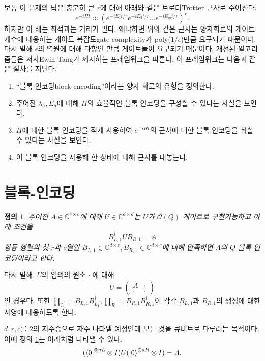\documentclass[a4paper,atbegshi,chapter]{oblivoir}
\newtheorem{defn}{정의}[chapter]
\begin{document}
보통 이 문제의 답은 충분히 큰 $r$에 대해 아래와 같은 트로터{\tiny Trotter}
근사로 주어진다.
\[
  e^{-iHt}\approx (e^{-iE_1t/r}e^{-iE_2t/r}\ldots e^{-iE_mt/r})^r.
\]
하지만 이 해는 최적과는 거리가 멀다. 왜냐하면 위와 같은 근사는 양자회로의
게이트 개수에 대응하는 게이트 복잡도{\tiny gate complexity}가 
poly($1/\epsilon$)만큼 요구되기 때문이다. 다시 말해 $\epsilon$의 역원에 대해
다항인 만큼 게이트들이 요구되기 때문이다. 개선된 알고리즘들은 저자{\tiny Ewin
Tang}가 제시하는 프레임워크을 따른다.  이 프레임워크는 다음과 같은 절차를 지닌다.
\begin{enumerate}[label=(\roman*)]
  \item ``블록-인코딩{\tiny block-encoding}''이라는 양자 회로의 유형을 정의한다.
  \item 주어진 $\lambda_a, E_a$에 대해 $H$의 효율적인 블록-인코딩을 구성할 수
    있다는 사실을 보인다.
  \item $H$에 대한 블록-인코딩을 적게 사용하여 $e^{-iHt}$의 근사에 대한
    블록-인코딩을 취할 수 있다는 사실을 보인다.
  \item 이 블록-인코딩을 사용해 한 상태에 대해 근사를 내놓는다.
\end{enumerate}
\section{블록-인코딩}
\begin{defn}\label{def:15}
  주어진 $A\in\mathbb{C}^{r\times c}$에 대해 $U\in\mathbb{C}^{d\times d}$는
  $U$가 $\mathcal{O}(Q)$ 게이트로 구현가능하고 아래 조건을
  \[
    B_{L,1}^{\dagger}UB_{R,1}=A
  \]
  항등 행렬의 첫 $r$과 $c$열인 $B_{L,1}\in\mathbb{C}^{d\times r}, 
  B_{R,1}\in\mathbb{C}^{d\times c}$에 대해 만족하면 $A$의 $Q$-블록 인코딩이라고
  한다. 
\end{defn}
다시 말해, $U$의 임의의 원소 $\cdot\;$에 대해
  \[
    U=\begin{pmatrix}A & \cdot \\ \cdot &\cdot\end{pmatrix}
  \]
  인 경우다. 또한
  $\prod_L=B_{L,1}B^{\dagger}_{L_1}, \prod_R=B_{R,1}B_{R,1}^{\dagger}$이 각각
  $B_{L,1}$과 $B_{R,1}$의 생성에 대한 사영에 대응하도록 한다.

  $d,r,c$를 $2$의 지수승으로 자주 나타낼 예정인데 모든 것을 큐비트로 다루려는
  목적이다. 이에 정의 \ref{def:15}는 아래처럼 나타낼 수 있다.
  \[
    (\bra0^{\otimes aL}\otimes I)U(\ket0^{\otimes aR}\otimes I)=A.
  \]
\end{document}
